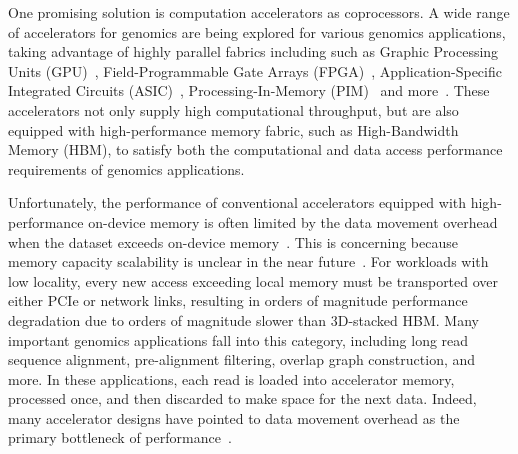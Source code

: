 One promising solution is computation accelerators as coprocessors.
A wide range of accelerators for genomics are being explored for various genomics applications, taking advantage of highly parallel fabrics including such as Graphic Processing Units (GPU)~\cite{guo2013gpu,liu2009cudasw++,liu2010cudasw++,jia2011metabing,liu2013cudasw++,cho2013xsd,su2014gpu,liu2015gswabe,wilton2015arioc,de2016cudalign,nishimura2017accelerating,kobus2017accelerating,houtgast2017efficient,cheng2018bitmapper2,ahmed2019gasal2,zeni2020logan,gamaarachchi2020gpu,kobus2021metacache,wang2023gpmeta,ju2024seedhitgpu}, Field-Programmable Gate Arrays (FPGA)~\cite{arram2015fpgareferencecompressiongenomic,chen2023efficientsequencingcompressionfpga,chen2014accelerating,zhao2017streaming,liao2018adaptively,qiao2019fpga,chen2021high,haghi2021fpga,li2021pipebsw,liyanage2023efficient}, Application-Specific Integrated Circuits (ASIC)~\cite{madhavan2014race,turakhia2017darwin,turakhia2018darwin,huangfu2018radar,fujiki2018genax,turakhia2019darwin}, Processing-In-Memory (PIM)~\cite{zokaee2018aligner,angizi2019aligns,gupta2019rapid,kaplan2020bioseal,chen2020parc,cali2020genasm,khatamifard2021genvom,li2021pim,wu2021sieve,shahroodi2022krakenonmem,shahroodi2022demeter,hanhan2022edam,zou2022biohd,jahshan2023dash,zhang2023aligner} and more~\cite{sarkar2019algorithm,sarkar2021quaser,mansouri2022genstore,varsamis2023quantum,wu2024abakus,ghiasi2024megis}.
These accelerators not only supply high computational throughput, but are also equipped with high-performance memory fabric, such as High-Bandwidth Memory (HBM), to satisfy both the computational and data access performance requirements of genomics applications.

Unfortunately, the performance of conventional accelerators equipped with high-performance on-device memory is often limited by the data movement overhead when the dataset exceeds on-device memory~\cite{zhang2019flashgpu,dhar2019near,lee2020optimizing,jonatan2024scalability}.
This is concerning because memory capacity scalability is unclear in the near future~\cite{kim2015architectural,shiratake2020scaling,kim2024present,hyun2024pathfinding}.
For workloads with low locality, every new access exceeding local memory must be transported over either PCIe or network links, resulting in orders of magnitude performance degradation due to orders of magnitude slower than 3D-stacked HBM.
Many important genomics applications fall into this category, including long read sequence alignment, pre-alignment filtering, overlap graph construction, and more.
In these applications, each read is loaded into accelerator memory, processed once, and then discarded to make space for the next data.
Indeed, many accelerator designs have pointed to data movement overhead as the primary bottleneck of performance~\cite{mailthody2019deepstore,liang2019ins,zhang2020dram,fang2020memory,preethi2020fpga,kim2021behemoth,singh2021fpga,zhou2022survey,knoben2023improving}.

